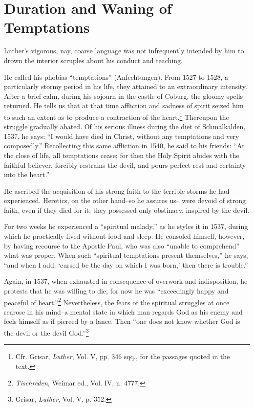 \section{Duration and Waning of Temptations}

Luther’s vigorous, nay, coarse language was not infrequently intended
by him to drown the interior scruples about his conduct and
teaching.

He called his phobias “temptations” (Anfechtungen). From 1527
to 1528, a particularly stormy period in his life, they attained to
an extraordinary intensity. After a brief calm, during his sojourn in
the castle of Coburg, the gloomy spells returned. He tells us that at
that time affliction and sadness of spirit seized him to such an extent
as to produce a contraction of the heart.\footnote
{Cfr. Grisar, \textit{Luther}, Vol. V, pp. 346 sqq., for the passages quoted in the text.}
Thereupon the struggle
gradually abated. Of his serious illness during the diet of Schmalkalden,
1537, he says: “I would have died in Christ, without any
temptations and very composedly.” Recollecting this same affliction
in 1540, he said to his friends: “At the close of life, all temptations
cease; for then the Holy Spirit abides with the faithful believer, forcibly
restrains the devil, and pours perfect rest and certainty into the
heart.”

He ascribed the acquisition of his strong faith to the terrible storms
he had experienced. Heretics, on the other hand--so he assures us--
were devoid of strong faith, even if they died for it; they possessed
only obstinacy, inspired by the devil.

For two weeks he experienced a “spiritual malady,” as he styles it in
1537, during which he practically lived without food and sleep. He
consoled himself, however, by having recourse to the Apostle Paul,
who was also “unable to comprehend” what was proper. When such
“spiritual temptations present themselves,” he says, “and when I
add: ‘cursed be the day on which I was born,’ then there is trouble.”

Again, in 1537, when exhausted in consequence of overwork and
indisposition, he protests that he was willing to die; for now he was
“exceedingly happy and peaceful of heart.”\footnote{\textit{Tischreden}, Weimar ed., Vol. IV, n. 4777.}
Nevertheless, the fears
of the spiritual struggles at once rearose in his mind--a mental
state in which man regards God as his enemy and feels himself as if
pierced by a lance. Then “one does not know whether God is the
devil or the devil God.”\footnote{Grisar, \textit{Luther}, Vol. V, p. 352.}

